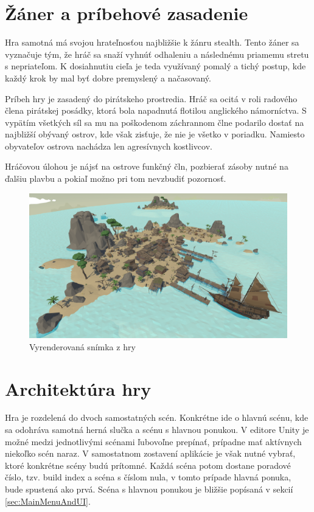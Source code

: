 \documentclass[slovak, master]{diploma}
\begin{document}
\section{Žáner a príbehové zasadenie}
\label{sec:GenreAndSetting}
Hra samotná má svojou hrateľnosťou najbližšie k žánru stealth. Tento žáner sa vyznačuje tým, že hráč sa snaží vyhnúť odhaleniu a následnému priamemu stretu s nepriateľom. K dosiahnutiu cieľa je teda využívaný pomalý a tichý postup, kde každý krok by mal byť dobre premyslený a načasovaný. 

Príbeh hry je zasadený do pirátskeho prostredia. Hráč sa ocitá v roli radového člena pirátskej posádky, ktorá bola napadnutá flotilou anglického námorníctva. S vypätím všetkých síl sa mu na poškodenom záchrannom člne podarilo dostať na najbližší obývaný ostrov, kde však zisťuje, že nie je všetko v poriadku. Namiesto obyvateľov ostrova nachádza len agresívnych kostlivcov. 

Hráčovou úlohou je nájsť na ostrove funkčný čln, pozbierať zásoby nutné na ďalšiu plavbu a pokiaľ možno pri tom nevzbudiť pozornosť.

\begin{figure}[!htbp]
	\centering
	\includegraphics[width=.9\textwidth]{Figures/game_compressed.png}
	\caption{Vyrenderovaná snímka z hry}
	\label{pic:GameScreenshot}
\end{figure}

\section{Architektúra hry}
\label{sec:GameStructure}
Hra je rozdelená do dvoch samostatných scén. Konkrétne ide o hlavnú scénu, kde sa odohráva samotná herná slučka a scénu s hlavnou ponukou. V editore Unity je možné medzi jednotlivými scénami ľubovoľne prepínať, prípadne mať aktívnych niekoľko scén naraz. V samostatnom zostavení aplikácie je však nutné vybrať, ktoré konkrétne scény budú prítomné. Každá scéna potom dostane poradové číslo, tzv. build index a scéna s číslom nula, v tomto prípade hlavná ponuka, bude spustená ako prvá. Scéna s hlavnou ponukou je bližšie popísaná v sekcií \ref{sec:MainMenuAndUI}.
\end{document}
